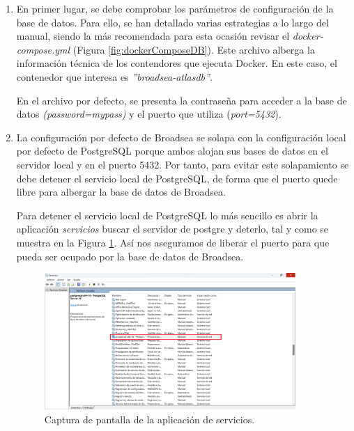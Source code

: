 \begin{enumerate}

    \item En primer lugar, se debe comprobar los parámetros de configuración de la base de datos. Para ello, se han detallado varias estrategias a lo largo del manual, siendo la más recomendada para esta ocasión revisar el \textit{docker-compose.yml} (Figura \ref{fig:dockerComposeDB}). Este archivo alberga la información técnica de los contendores que ejecuta Docker. En este caso, el contenedor que interesa es \textit{''broadsea-atlasdb''}.

    En el archivo por defecto, se presenta la contraseña para acceder a la base de datos \textit{(password=mypass)} y el puerto que utiliza (\textit{port=5432}).

    \item La configuración por defecto de Broadsea se solapa con la configuración local por defecto de PostgreSQL porque ambos alojan sus bases de datos en el servidor local y en el puerto 5432. Por tanto, para evitar este solapamiento se debe detener el servicio local de PostgreSQL, de forma que el puerto quede libre para albergar la base de datos de Broadsea.

    Para detener el servicio local de PostgreSQL lo más sencillo es abrir la aplicación \textit{servicios} buscar el servidor de postgre y deterlo, tal y como se muestra en la Figura \ref{fig:serviciosConfig}. Así nos aseguramos de liberar el puerto para que pueda ser ocupado por la base de datos de Broadsea.

    \begin{figure}[H]
    \centering
    \includegraphics[width=0.90\textwidth]{figures/serviciosConfig.png}
     \caption{Captura de pantalla de la aplicación de servicios.}
    \label{fig:serviciosConfig}
    \end{figure}


\end{enumerate}
